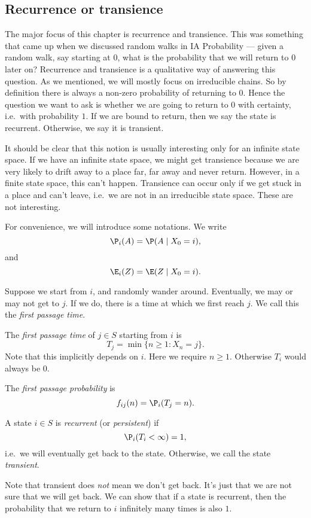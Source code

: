 \documentclass[a4paper]{article}
\begin{document}
\subsection{Recurrence or transience}
The major focus of this chapter is recurrence and transience. This was something that came up when we discussed random walks in IA Probability --- given a random walk, say starting at $0$, what is the probability that we will return to $0$ later on? Recurrence and transience is a qualitative way of answering this question. As we mentioned, we will mostly focus on irreducible chains. So by definition there is always a non-zero probability of returning to $0$. Hence the question we want to ask is whether we are going to return to $0$ with certainty, i.e.\ with probability $1$. If we are bound to return, then we say the state is recurrent. Otherwise, we say it is transient.

It should be clear that this notion is usually interesting only for an infinite state space. If we have an infinite state space, we might get transience because we are very likely to drift away to a place far, far away and never return. However, in a finite state space, this can't happen. Transience can occur only if we get stuck in a place and can't leave, i.e.\ we are not in an irreducible state space. These are not interesting.

\begin{notation}
  For convenience, we will introduce some notations. We write
  \[
    \P_i(A) = \P(A\mid X_0 = i),
  \]
  and
  \[
    \E_i(Z) = \E(Z\mid X_0 = i).
  \]
\end{notation}

Suppose we start from $i$, and randomly wander around. Eventually, we may or may not get to $j$. If we do, there is a time at which we first reach $j$. We call this the \emph{first passage time}.

\begin{defi}
  The \emph{first passage time} of $j \in S$ starting from $i$ is
  \[
    T_j = \min\{n \geq 1: X_n = j\}.
  \]
  Note that this implicitly depends on $i$. Here we require $n \geq 1$. Otherwise $T_i$ would always be $0$.

  The \emph{first passage probability} is
  \[
    f_{ij}(n) = \P_i(T_j = n).
  \]
\end{defi}

\begin{defi}
  A state $i\in S$ is \emph{recurrent} (or \emph{persistent}) if
  \[
    \P_i (T_i < \infty) = 1,
  \]
  i.e.\ we will eventually get back to the state. Otherwise, we call the state \emph{transient}.
\end{defi}
Note that transient does \emph{not} mean we don't get back. It's just that we are not sure that we will get back. We can show that if a state is recurrent, then the probability that we return to $i$ infinitely many times is also $1$.
\end{document}
